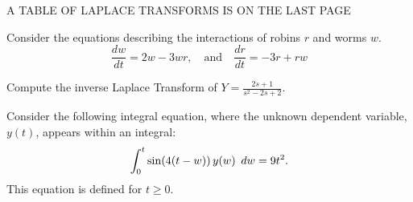 \documentclass[12pt]{exam}
\begin{document}
    


\vspace{1cm}
\begin{center}
    A TABLE OF LAPLACE TRANSFORMS IS ON THE LAST PAGE
\end{center}

\newpage \InitialsRight


\begin{questions}
    \question[3] %
        Consider the equations describing the interactions of robins $r$ and worms $w$.
        $$\frac{dw}{dt} = 2w - 3wr, \quad \text{and} \quad \frac{dr}{dt} = - 3r+rw$$
        
    \question[5] Compute the inverse Laplace Transform of  $\displaystyle Y = \frac{2s+1}{s^2-2s+2}$. %
    
    
    
        
\newpage \InitialsLeft 
    
    \question[6] %
    Consider the following integral equation, where the unknown dependent variable, \(y(t)\), appears within an integral:
    \[\int_0^t \sin\Large(4 (t-w)\Large)\, y(w) \ dw = 9 t^2.\] This equation is defined for \(t \geq 0\).  
\end{questions}
\end{document}
